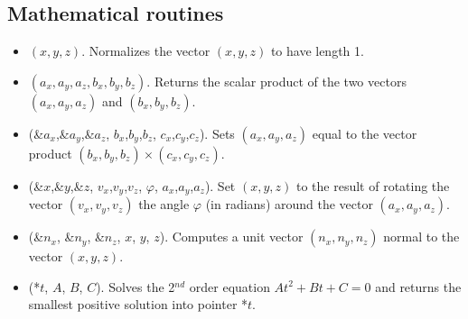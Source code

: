 \subsection{Mathematical routines}
\begin{itemize}
\item {}$(x,y,z)$. Normalizes the vector $(x,y,z)$ to have
  length 1.
\item {}$(a_x,a_y,a_z, b_x,b_y,b_z)$. Returns the scalar
  product of the two vectors $(a_x,a_y,a_z)$ and $(b_x,b_y,b_z)$.
\item {}(\&$a_x$,\&$a_y$,\&$a_z$, $b_x$,$b_y$,$b_z$, $c_x$,$c_y$,$c_z$). Sets
  $(a_x,a_y,a_z)$ equal to the vector product $(b_x,b_y,b_z) \times (c_x,c_y,c_z)$.
\item {}(\&$x$,\&$y$,\&$z$, $v_x$,$v_y$,$v_z$, $\varphi$, $a_x$,$a_y$,$a_z$). Set
  $(x,y,z)$ to the result of rotating the vector $(v_x,v_y,v_z)$
  the angle $\varphi$ (in radians) around the vector $(a_x,a_y,a_z)$.
\item {}(\&$n_x$, \&$n_y$, \&$n_z$, $x$, $y$, $z$).
  Computes a unit vector $(n_x, n_y, n_z)$ normal to the vector
  $(x,y,z)$.
\item {}(*$t$, $A$,  $B$,  $C$).
  Solves the 2$^{nd}$ order equation $At^2 + Bt + C = 0$ and returns
  the smallest positive solution into pointer *$t$.
\end{itemize}

